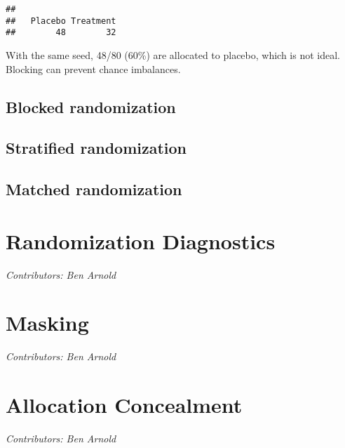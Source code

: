 \documentclass[
]{book}
\begin{document}
\begin{verbatim}
## 
##   Placebo Treatment 
##        48        32
\end{verbatim}

With the same seed, 48/80 (60\%) are allocated to placebo, which is not ideal. Blocking can prevent chance imbalances.

\hypertarget{blocked-randomization}{%
\section{Blocked randomization}\label{blocked-randomization}}

\hypertarget{stratified-randomization}{%
\section{Stratified randomization}\label{stratified-randomization}}

\hypertarget{matched-randomization}{%
\section{Matched randomization}\label{matched-randomization}}

\hypertarget{randomizationdiagnostics}{%
\chapter{Randomization Diagnostics}\label{randomizationdiagnostics}}

\emph{Contributors: Ben Arnold}

\hypertarget{masking}{%
\chapter{Masking}\label{masking}}

\emph{Contributors: Ben Arnold}

\hypertarget{allocationconcealment}{%
\chapter{Allocation Concealment}\label{allocationconcealment}}

\emph{Contributors: Ben Arnold}

  
\end{document}
